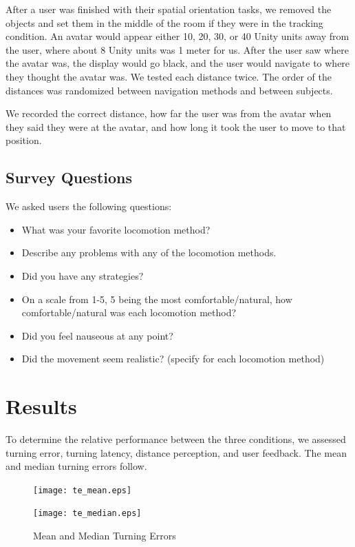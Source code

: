 \documentclass[titlepage]{article}
\theoremstyle{definition}
\theoremstyle{proof}
\begin{document}
After a user was finished with their spatial orientation tasks,
we removed the objects and set them in the middle of the room if they were in the tracking condition.
An avatar would appear either 10, 20, 30, or 40 Unity units away from the user,
where about 8 Unity units was 1 meter for us.
After the user saw where the avatar was, the display would go black,
and the user would navigate to where they thought the avatar was.
We tested each distance twice.
The order of the distances was randomized between navigation methods and between subjects.

We recorded
the correct distance,
how far the user was from the avatar when they said they were at the avatar,
and how long it took the user to move to that position.

\subsection{Survey Questions}
We asked users the following questions:
\begin{itemize}
\item What was your favorite locomotion method?
\item Describe any problems with any of the locomotion methods.
\item Did you have any strategies?
\item On a scale from 1-5, 5 being the most comfortable/natural,
  how comfortable/natural was each locomotion method?
\item Did you feel nauseous at any point?
\item Did the movement seem realistic? (specify for each locomotion method)
\end{itemize}

\newpage
\section{Results}
To determine the relative performance between the three conditions,
we assessed turning error, turning latency,
distance perception, and user feedback.
The mean and median turning errors follow.

\begin{figure}[h]
  \centering
  \begin{minipage}[h]{.45\linewidth}
    \texttt{[image: te\_mean.eps]}
  \end{minipage}
  \quad
  \begin{minipage}[h]{.45\linewidth}
    \texttt{[image: te\_median.eps]}
  \end{minipage}
  \caption{Mean and Median Turning Errors}
  \label{fig:turning_errors}
\end{figure}
\end{document}
